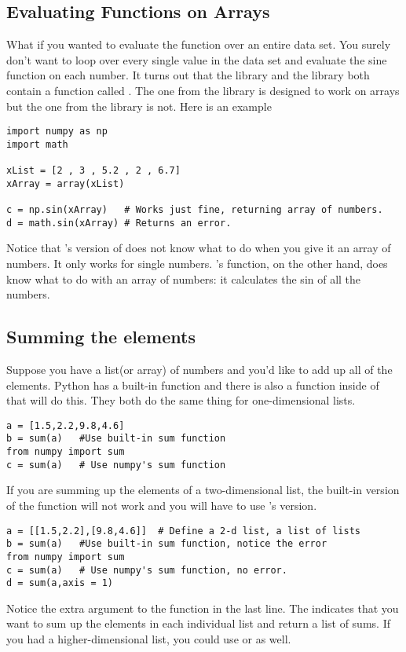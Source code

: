 \subsection*{Evaluating Functions on Arrays}
What if you wanted to evaluate the  function over an
entire data set.  You surely don't want to loop over every single
value in the data set and evaluate the sine function on each number.
It turns out that the  library and the 
library both contain a function called .  The one from the
 library is designed to work on arrays but the one from
the  library is not. Here is an example
\begin{Verbatim}
import numpy as np
import math

xList = [2 , 3 , 5.2 , 2 , 6.7]
xArray = array(xList)

c = np.sin(xArray)   # Works just fine, returning array of numbers.
d = math.sin(xArray) # Returns an error.
\end{Verbatim}
Notice that 's version of  does not
know what to do when you give it an array of numbers.  It only works
for single numbers.  's  function, on the
other hand, does know what to do with an array of numbers: it
calculates the sin of all the numbers.

\subsection*{Summing the elements}
Suppose you have a list(or array) of numbers and you'd like to add up
all of the elements.  Python has a built-in  function and
there is also a  function inside of  that
will do this. They both do the same thing for one-dimensional lists.
\begin{Verbatim}
a = [1.5,2.2,9.8,4.6]
b = sum(a)   #Use built-in sum function
from numpy import sum
c = sum(a)   # Use numpy's sum function
\end{Verbatim}
If you are summing up the elements of a two-dimensional list, the
built-in version of the function will not work and you will have to
use 's version.
\begin{Verbatim}
a = [[1.5,2.2],[9.8,4.6]]  # Define a 2-d list, a list of lists
b = sum(a)   #Use built-in sum function, notice the error
from numpy import sum
c = sum(a)   # Use numpy's sum function, no error.
d = sum(a,axis = 1)
\end{Verbatim}
Notice the extra argument to the  function in the last
line.  The  indicates that you want to sum up the
elements in each individual list and return a list of sums.  If you
had a higher-dimensional list, you could use  or
 as well.

